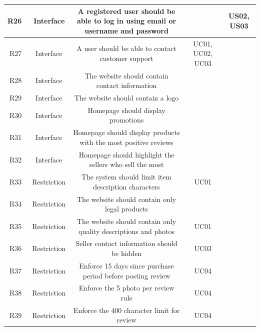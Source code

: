 \documentclass[11pt]{article}
\newcounter{use case ID}
\begin{document}
\begin{table}[htbp]
\begin{center}
\begin{tabular}{|r | c| c | c| c|}
                            \hline
                            R26 & \ Interface & A registered user should be able to log in using email or username and password & & US02, US03 \\
                             \hline
                            R27 & \ Interface & A user should be able to contact customer support & UC01, UC02, UC03 &  \\
                            \hline
                            R28 & \ Interface & The website should contain contact information & &  \\
                            \hline
                            R29 & \ Interface & The website should contain a logo & &  \\
                            \hline
                            R30 & \ Interface & Homepage should display promotions & &  \\
                            \hline
                            R31 & \ Interface & Homepage should display products with the most positive reviews & &  \\
                            \hline
                            R32 & \ Interface & Homepage should highlight the sellers who sell the most & &  \\
                            \hline
                            R33 & \ Restriction & The system should limit item description characters & UC01 &  \\
                             \hline
                            R34 & \ Restriction & The website should contain only legal products & &  \\
                            \hline
                            R35 & \ Restriction & The website should contain only quality descriptions and photos & UC01 &  \\
                            \hline
                            R36 & \ Restriction & Seller contact information should be hidden & UC03 &  \\
                            \hline
                            R37 & \ Restriction & Enforce 15 days since purchase period before posting review & UC04 &  \\
                            \hline
                            R38 & \ Restriction & Enforce the 5 photo per review rule & UC04 &  \\
                            \hline
                            R39 & \ Restriction & Enforce the 400 character limit for review & UC04 &  \\

\end{tabular}
\end{center}
\end{table}
\end{document}
